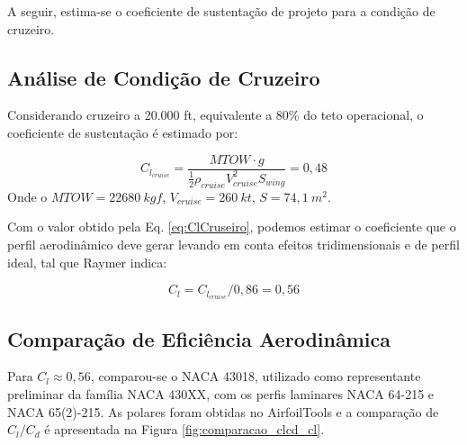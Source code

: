 A seguir, estima-se o coeficiente de sustentação de projeto para a condição de cruzeiro.

\subsection{Análise de Condição de Cruzeiro}

Considerando cruzeiro a 20.000 ft, equivalente a 80\% do teto operacional, o coeficiente de sustentação é estimado por:

\begin{equation}
\label{eq:ClCruseiro}
    C_{l_{cruise}} = \frac{MTOW \cdot g}{\frac{1}{2}\rho_{cruise} V_{cruise}^2 S_{wing}} = 0,48
\end{equation}
Onde o $MTOW = 22680 \ kgf$, $V_{cruise} = 260 \ kt$, $S = 74,1 \ m^2$.

Com o valor obtido pela Eq. \ref{eq:ClCruseiro}, podemos estimar o coeficiente que o perfil aerodinâmico deve gerar levando em conta efeitos tridimensionais e de perfil ideal, tal que Raymer \cite{raymer2018} indica:

\begin{equation}
\label{eq:Clperfildeverdade}
    C_l = C_{l_{cruise}}/0,86 = 0,56
\end{equation}

\subsection{Comparação de Eficiência Aerodinâmica}
\label{subsec:comparacao_ld_perfis}

Para $C_l \approx 0,56$, comparou-se o NACA 43018, utilizado como representante preliminar da família NACA 430XX, com os perfis laminares NACA 64-215 e NACA 65(2)-215. As polares foram obtidas no AirfoilTools \cite{airfoiltools} e a comparação de $C_l/C_d$ é apresentada na Figura \ref{fig:comparacao_clcd_cl}.

